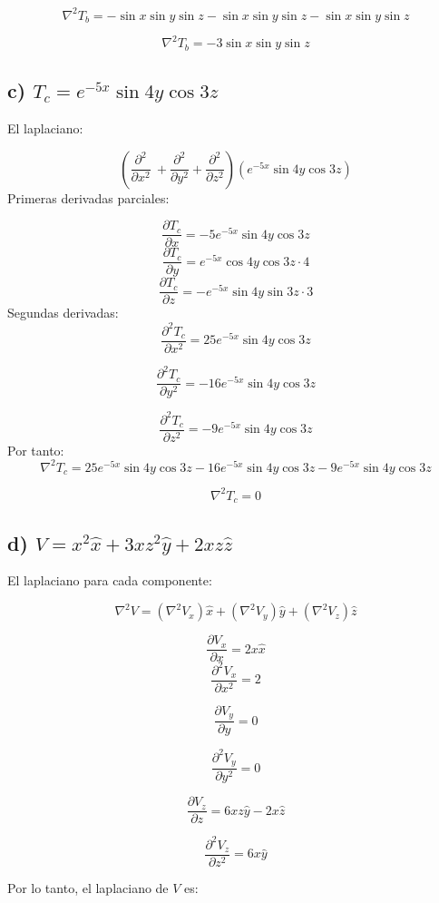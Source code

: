 \documentclass{article}
\begin{document}
\[
\nabla^2 T_b = -\sin x \sin y \sin z - \sin x \sin y \sin z - \sin x \sin y \sin z
\]

\[
\boxed{\nabla^2 T_b = -3 \sin x \sin y \sin z}
\]

\subsection*{c) \( T_c = e^{-5x} \sin 4y \cos 3z \)}

El laplaciano:

\[
 \left( \frac{\partial^2}{\partial x^2}\  + \frac{\partial^2}{\partial y^2}+ \frac{\partial^2}{\partial z^2} \right) \left( e^{-5x} \sin 4y \cos 3z \right)
\]
Primeras derivadas parciales:

\[
\frac{\partial T_c}{\partial x} = -5e^{-5x} \sin 4y \cos 3z
\]
\[
\frac{\partial T_c}{\partial y} = e^{-5x} \cos 4y \cos 3z \cdot 4
\]
\[
\frac{\partial T_c}{\partial z} = -e^{-5x} \sin 4y \sin 3z \cdot 3
\]
Segundas derivadas:
\[
\frac{\partial^2 T_c}{\partial x^2} = 25e^{-5x} \sin 4y \cos 3z
\]

\[
\frac{\partial^2 T_c}{\partial y^2} = -16e^{-5x} \sin 4y \cos 3z
\]


\[
\frac{\partial^2 T_c}{\partial z^2} = -9e^{-5x} \sin 4y \cos 3z
\]
Por tanto:
\[
\nabla^2 T_c = 25e^{-5x} \sin 4y \cos 3z - 16e^{-5x} \sin 4y \cos 3z - 9e^{-5x} \sin 4y \cos 3z
\]

\[
\boxed{\nabla^2 T_c = 0}
\]

\subsection*{d) \( V = x^2 \hat{x} + 3x z^2 \hat{y} + 2xz \hat{z} \)}

El laplaciano para cada componente:

\[
\nabla^2 V = \left( \nabla^2 V_x \right) \hat{x} + \left( \nabla^2 V_y \right) \hat{y} + \left( \nabla^2 V_z \right) \hat{z}
\]


\[
\frac{\partial V_x}{\partial x} = 2x \hat{x}
\] \[
\frac{\partial^2 V_x}{\partial x^2} = 2
\]


\[
\frac{\partial V_y}{\partial y} = 0
\]

\[
\frac{\partial^2 V_y}{\partial y^2} = 0
\]

\[
\frac{\partial V_z}{\partial z} = 6xz\hat{y} - 2x\hat{z}
\]

\[
\frac{\partial^2 V_z}{\partial z^2} = 6x \hat{y}
\]

Por lo tanto, el laplaciano de \( V \) es:
\end{document}
